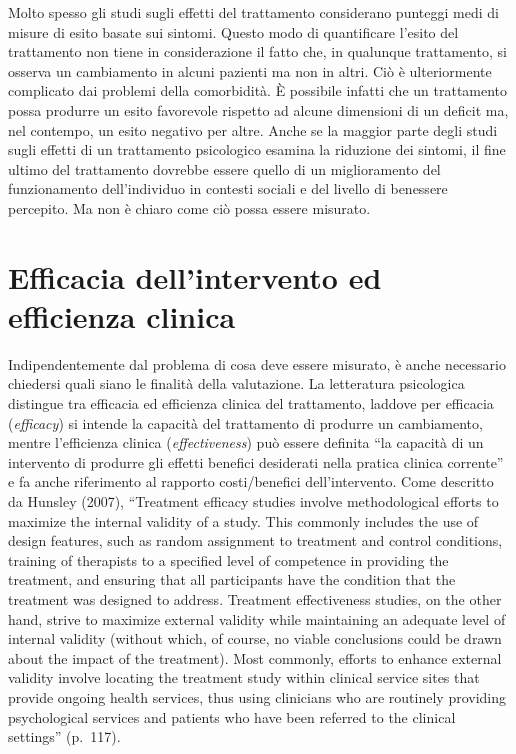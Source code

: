 \documentclass[
  11pt,
]{krantz}
\theoremstyle{definition}
\theoremstyle{definition}
\theoremstyle{definition}
\theoremstyle{definition}
\theoremstyle{remark}
\begin{document}
Molto spesso gli studi sugli effetti del trattamento considerano punteggi medi di misure di esito basate sui sintomi. Questo modo di quantificare l'esito del trattamento non tiene in considerazione il fatto che, in qualunque trattamento, si osserva un cambiamento in alcuni pazienti ma non in altri. Ciò è ulteriormente complicato dai problemi della comorbidità. È possibile infatti che un trattamento possa produrre un esito favorevole rispetto ad alcune dimensioni di un deficit ma, nel contempo, un esito negativo per altre. Anche se la maggior parte degli studi sugli effetti di un trattamento psicologico esamina la riduzione dei sintomi, il fine ultimo del trattamento dovrebbe essere quello di un miglioramento del funzionamento dell'individuo in contesti sociali e del livello di benessere percepito. Ma non è chiaro come ciò possa essere misurato.

\hypertarget{efficacia-dellintervento-ed-efficienza-clinica}{%
\section{Efficacia dell'intervento ed efficienza clinica}\label{efficacia-dellintervento-ed-efficienza-clinica}}

Indipendentemente dal problema di cosa deve essere misurato, è anche necessario chiedersi quali siano le finalità della valutazione. La letteratura psicologica distingue tra efficacia ed efficienza clinica del trattamento, laddove per efficacia (\emph{efficacy}) si intende la capacità del trattamento di produrre un cambiamento, mentre l'efficienza clinica (\emph{effectiveness}) può essere definita ``la capacità di un intervento di produrre gli effetti benefici desiderati nella pratica clinica corrente'' e fa anche riferimento al rapporto costi/benefici dell'intervento. Come descritto da Hunsley (2007), ``Treatment efficacy studies involve methodological efforts to maximize the internal validity of a study. This commonly includes the use of design features, such as random assignment to treatment and control conditions, training of therapists to a specified level of competence in providing the treatment, and ensuring that all participants have the condition that the treatment was designed to address. Treatment effectiveness studies, on the other hand, strive to maximize external validity while maintaining an adequate level of internal validity (without which, of course, no viable conclusions could be drawn about the impact of the treatment). Most commonly, efforts to enhance external validity involve locating the treatment study within clinical service sites that provide ongoing health services, thus using clinicians who are routinely providing psychological services and patients who have been referred to the clinical settings'' (p.~117).
\end{document}
